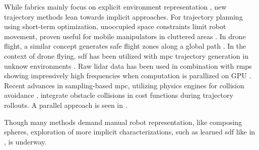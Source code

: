 While \ac{fabrics} mainly focus on explicit environment representation
\cite{Spahn2023,Ratliff2020}, new trajectory methods lean towards implicit
approaches. For trajectory planning using short-term optimization, unoccupied
space constraints limit robot movement, proven useful for mobile manipulators in
cluttered areas \cite{Spahn2021}.
In drone flight, a similar concept generates safe flight zones along a global
path \cite{Liu2017a,Tordesillas2019a}. In the context of drone flying,
\ac{sdf} has been utilized with \ac{mpc} trajectory generation in unknow
environments \cite{Oleynikova2017voxblox}. Raw lidar data has been used in combination
with \acp{rmp} showing impressively high frequencies when computation is
parallized on GPU \cite{Pantic2023obstacle}.
Recent advances in sampling-based
\ac{mpc}, utilizing physics engines for collision avoidance
\cite{Pezzato2023sampling},
integrate obstacle collisions in cost functions during trajectory rollouts. A
parallel approach is seen in \cite{Sundaralingam2023curobo}.

Though many methods demand manual robot representation, like composing spheres,
exploration of more implicit characterizations, such as learned \ac{sdf} like in
\cite{Liu2022regularized,Koptev2023neural}, is underway.
